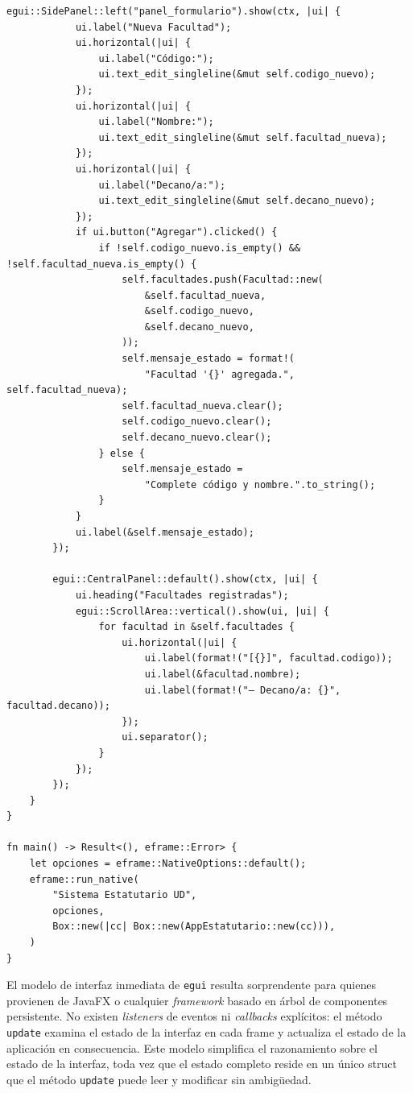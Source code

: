 \begin{lstlisting}[style=rustStyle, caption={Interfaz gráfica básica con \texttt{eframe}/\texttt{egui}}, label={lst:egui}]
        egui::SidePanel::left("panel_formulario").show(ctx, |ui| {
            ui.label("Nueva Facultad");
            ui.horizontal(|ui| {
                ui.label("Código:");
                ui.text_edit_singleline(&mut self.codigo_nuevo);
            });
            ui.horizontal(|ui| {
                ui.label("Nombre:");
                ui.text_edit_singleline(&mut self.facultad_nueva);
            });
            ui.horizontal(|ui| {
                ui.label("Decano/a:");
                ui.text_edit_singleline(&mut self.decano_nuevo);
            });
            if ui.button("Agregar").clicked() {
                if !self.codigo_nuevo.is_empty() && !self.facultad_nueva.is_empty() {
                    self.facultades.push(Facultad::new(
                        &self.facultad_nueva,
                        &self.codigo_nuevo,
                        &self.decano_nuevo,
                    ));
                    self.mensaje_estado = format!(
                        "Facultad '{}' agregada.", self.facultad_nueva);
                    self.facultad_nueva.clear();
                    self.codigo_nuevo.clear();
                    self.decano_nuevo.clear();
                } else {
                    self.mensaje_estado =
                        "Complete código y nombre.".to_string();
                }
            }
            ui.label(&self.mensaje_estado);
        });

        egui::CentralPanel::default().show(ctx, |ui| {
            ui.heading("Facultades registradas");
            egui::ScrollArea::vertical().show(ui, |ui| {
                for facultad in &self.facultades {
                    ui.horizontal(|ui| {
                        ui.label(format!("[{}]", facultad.codigo));
                        ui.label(&facultad.nombre);
                        ui.label(format!("— Decano/a: {}", facultad.decano));
                    });
                    ui.separator();
                }
            });
        });
    }
}

fn main() -> Result<(), eframe::Error> {
    let opciones = eframe::NativeOptions::default();
    eframe::run_native(
        "Sistema Estatutario UD",
        opciones,
        Box::new(|cc| Box::new(AppEstatutario::new(cc))),
    )
}
\end{lstlisting}

\noindent
El modelo de interfaz inmediata de \texttt{egui} resulta sorprendente para quienes
provienen de JavaFX o cualquier \textit{framework} basado en árbol de componentes
persistente. No existen \textit{listeners} de eventos ni \textit{callbacks} explícitos:
el método \texttt{update} examina el estado de la interfaz en cada frame y actualiza
el estado de la aplicación en consecuencia. Este modelo simplifica el razonamiento
sobre el estado de la interfaz, toda vez que el estado completo reside en un único
struct que el método \texttt{update} puede leer y modificar sin ambigüedad.

